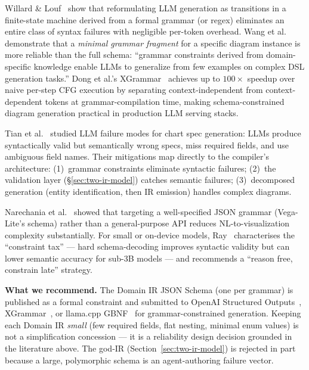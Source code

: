 Willard \& Louf~\cite{willard2023} show that reformulating LLM generation as
transitions in a finite-state machine derived from a formal grammar (or
regex) eliminates an entire class of syntax failures with negligible
per-token overhead.
Wang et al.~\cite{wang2023grammar} demonstrate that a \emph{minimal grammar
fragment} for a specific diagram instance is more reliable than the full
schema: ``grammar constraints derived from domain-specific knowledge enable
LLMs to generalize from few examples on complex DSL generation tasks.''
Dong et al.'s XGrammar~\cite{dong2024xgrammar} achieves up to $100\times$
speedup over naive per-step CFG execution by separating context-independent
from context-dependent tokens at grammar-compilation time, making
schema-constrained diagram generation practical in production LLM
serving stacks.

Tian et al.~\cite{tian2023chartgpt} studied LLM failure modes for chart spec
generation: LLMs produce syntactically valid but semantically wrong specs,
miss required fields, and use ambiguous field names.
Their mitigations map directly to the compiler's architecture: (1)~grammar
constraints eliminate syntactic failures; (2)~the validation layer (§\ref{sec:two-ir-model}) catches semantic failures; (3)~decomposed
generation (entity identification, then IR emission) handles complex diagrams.

Narechania et al.~\cite{narechania2021nl4dv} showed that targeting a
well-specified JSON grammar (Vega-Lite's schema) rather than a general-purpose
API reduces NL-to-visualization complexity substantially.
For small or on-device models, Ray~\cite{ray2026constraint} characterises the
``constraint tax'' --- hard schema-decoding improves syntactic validity but
can lower semantic accuracy for sub-3B models --- and recommends a
``reason free, constrain late'' strategy.

\medskip\noindent
\textbf{What we recommend.}
The Domain IR JSON Schema (one per grammar) is published as a formal
constraint and submitted to OpenAI Structured Outputs~\cite{openai-structured-outputs},
XGrammar~\cite{dong2024xgrammar}, or llama.cpp
GBNF~\cite{llama2024gbnf} for grammar-constrained generation.
Keeping each Domain IR \emph{small} (few required fields, flat nesting,
minimal enum values) is not a simplification concession --- it is a
reliability design decision grounded in the literature above.
The god-IR (Section~\ref{sec:two-ir-model}) is rejected in part because a
large, polymorphic schema is an agent-authoring failure vector.

